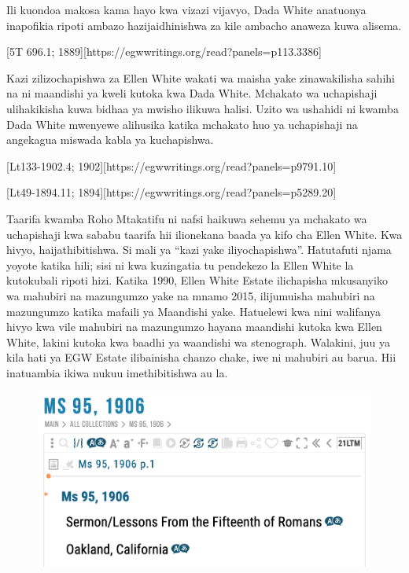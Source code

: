 Ili kuondoa makosa kama hayo kwa vizazi vijavyo, Dada White anatuonya inapofikia ripoti ambazo hazijaidhinishwa za kile ambacho anaweza kuwa alisema.

[5T 696.1; 1889][https://egwwritings.org/read?panels=p113.3386]

Kazi zilizochapishwa za Ellen White wakati wa maisha yake zinawakilisha sahihi na ni maandishi ya kweli kutoka kwa Dada White. Mchakato wa uchapishaji ulihakikisha kuwa bidhaa ya mwisho ilikuwa halisi. Uzito wa ushahidi ni kwamba Dada White mwenyewe alihusika katika mchakato huo ya uchapishaji na angekagua miswada kabla ya kuchapishwa.

[Lt133-1902.4; 1902][https://egwwritings.org/read?panels=p9791.10]

[Lt49-1894.11; 1894][https://egwwritings.org/read?panels=p5289.20]

Taarifa kwamba Roho Mtakatifu ni nafsi haikuwa sehemu ya mchakato wa uchapishaji kwa sababu taarifa hii ilionekana baada ya kifo cha Ellen White. Kwa hivyo, haijathibitishwa. Si mali ya “kazi yake iliyochapishwa”. Hatutafuti njama yoyote katika hili; sisi ni kwa kuzingatia tu pendekezo la Ellen White la kutokubali ripoti hizi. Katika 1990, Ellen White Estate ilichapisha mkusanyiko wa mahubiri na mazungumzo yake na mnamo 2015, ilijumuisha mahubiri na mazungumzo katika mafaili ya Maandishi yake. Hatuelewi kwa nini walifanya hivyo kwa vile mahubiri na mazungumzo hayana maandishi kutoka kwa Ellen White, lakini kutoka kwa baadhi ya waandishi wa stenograph. Walakini, juu ya kila hati ya EGW Estate ilibainisha chanzo chake, iwe ni mahubiri au barua. Hii inatuambia ikiwa nukuu imethibitishwa au la.

\begin{figure}
    \centering
    \includegraphics[width=1\linewidth]{images/sermons-and-talks.png}
    \label{fig:enter-label}
\end{figure}

